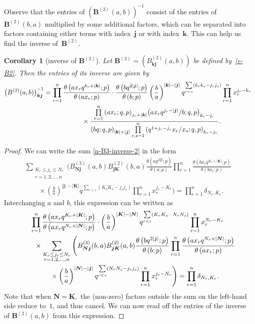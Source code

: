 \documentclass[pdftex]{sigma}
\numberwithin{equation}{section}
\newtheorem{Corollary}[Theorem]{Corollary}
\newcommand{\sumN}{{\left| \boldsymbol{N} \right|}}
\newcommand\sumK{{\left| \boldsymbol{K} \right|}}
\newcommand\sumj{{\left| \boldsymbol {j} \right|}}
\newcommand\sumk{{\left| \boldsymbol{k} \right|}}
\newcommand{\B}{{ \mathbf B}}
\newcommand{\N}{{ \boldsymbol N}}
\newcommand{\K}{{ \boldsymbol K}}
\renewcommand{\k}{{ \boldsymbol{k}}}
\renewcommand{\j}{{ \boldsymbol{j}}}
\newcommand{\sqprod}[1]{\prod\limits_{r, s =1}^{#1}} %
\newcommand{\smallprod}[1]{\prod\limits_{r =1}^{#1}} %
\newcommand{\xover}[1]{#1_{r}/#1_{s}}
\newcommand{\ellipticqrfac}[2]{{\left({#1}; q, p\right)_{#2}}} %
\newcommand{\elliptictheta}[1]{\theta \left({#1} ; p\right) }
\begin{document}
Observe that the entries of $(\B^{(3)}(a,b))^{-1}$ consist of the entries of $\B^{(2)}(b,a)$ multiplied by some additional factors, which can be separated into factors containing either terms with index~$\j$ or with index~$\k$. This can help us find the inverse of~$\B^{(2)}$.
\begin{Corollary}[inverse of $\B^{(2)}$]\label{cor:e-B2-inverse} Let $\B^{(2)}= (B^{(2)}_{\k\j}(a,b))$ be defined by~\eqref{e-B2}. Then the entries of its inverse are given by
\begin{gather*}
\big(B^{(2)}(a,b)\big)_{\k \j}^{-1} =
\smallprod n \frac{\elliptictheta{ax_rq^{k_r+\sumk}}}{\elliptictheta{ax_r}}
\cdot \frac{\elliptictheta{bq^{2\sumj}}}{\elliptictheta{b}} \left( \frac{b}{a}\right)^{\sumk-\sumj}
q^{\sum\limits_{r<s}(k_rk_s- j_rj_s)} \smallprod n x_r^{j_r-k_r}\\
 \hphantom{\big(B^{(2)}(a,b)\big)_{\k \j}^{-1} =}{} \times
\frac{ \smallprod n
 \ellipticqrfac{ax_r}{j_r+\sumk} \ellipticqrfac{ax_r q^{j_r-\sumj}/b}{k_r-j_r} }
{ \ellipticqrfac{bq}{\sumk+\sumj} \sqprod n \ellipticqrfac{q^{1+j_r-j_s}\xover x }{k_r-j_r} }.%
\end{gather*}
\end{Corollary}
\begin{proof} We can write the sum \eqref{n-B3-inverse-2} in the form
 \begin{gather*}%
 \sum\limits_{\substack{{K_r\le j_r \le N_r} \\
{r =1,2,\dots, n}}} \Bigg( B^{(3)}_{\N\j} (a,b) B^{(2)}_{\j\K}(b,a)
 \frac{\elliptictheta{aq^{2\sumj}}}{\elliptictheta{a}}
\smallprod n \frac{\elliptictheta{bx_rq^{K_r+\sumK}}}{\elliptictheta{bx_r}} \\
\qquad{} \times \left( \frac{b}{a}\right)^{\sumj-\sumK} q^{\sum\limits_{r<s}(K_r K_s- j_r j_s)}
\smallprod n x_r^{j_r-K_r} \Bigg)= \smallprod n \delta_{N_r, K_r}.
\end{gather*}
Interchanging $a$ and $b$, this expression can be written as
\begin{gather*}%
\smallprod n \frac{\elliptictheta{ax_rq^{K_r+\sumK}}}{\elliptictheta{ax_rq^{N_r+\sumN}}}
\cdot \left( \frac{b}{a}\right)^{\sumK-\sumN} q^{\sum\limits_{r<s}(K_r K_s- N_r N_s)}
\smallprod n x_r^{N_r-K_r} \\
\qquad{} \times \sum\limits_{\substack{{K_r\le j_r \le N_r} \cr
{r =1,2,\dots, n}}} \Bigg( B^{(3)}_{\N\j} (b,a) B^{(2)}_{\j\K}(a,b)
 \frac{\elliptictheta{bq^{2\sumj}}}{\elliptictheta{b}}
\smallprod n \frac{\elliptictheta{ax_rq^{N_r+\sumN}}}{\elliptictheta{ax_r}} \\
\qquad{} \times \left( \frac{b}{a}\right)^{\sumN-\sumj} q^{\sum\limits_{r<s}(N_r N_s- j_r j_s)}
\smallprod n x_r^{j_r-N_r} \Bigg) = \smallprod n \delta_{N_r, K_r}.
\end{gather*}
Note that when $\N=\K,$ the (non-zero) factors outside the sum on the left-hand side reduce to~$1$, and thus cancel. We can now read off the entries of the inverse of $\B^{(2)}(a,b)$ from this expression.
\end{proof}
\end{document}
